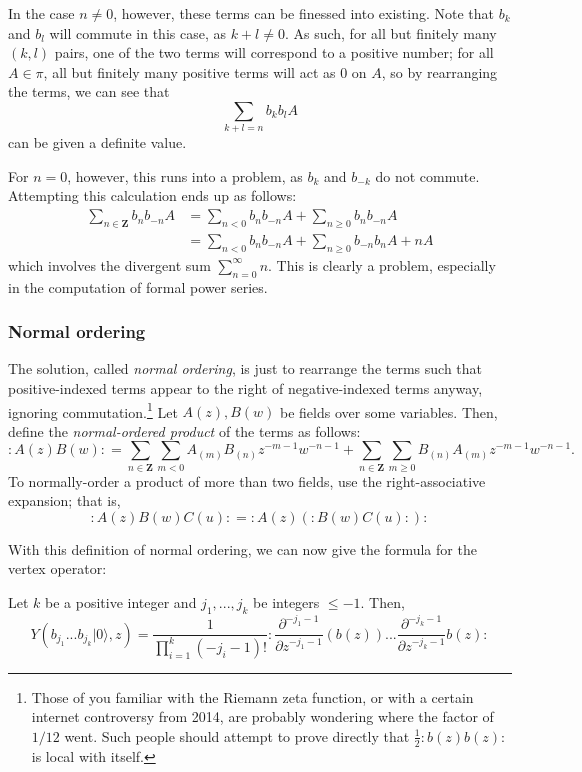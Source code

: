 \documentclass{article}
\newcommand{\ZZ}{\mathbold{Z}}
\newcommand{\vac}{|0\rangle}
\newcommand{\normord}[1]{:\mathrel{#1}:}
\begin{document}
In the case $n \ne 0$, however, these terms can be finessed into existing.  Note that $b_k$ and $b_l$ will commute in this case, as $k+l \ne 0$.  As such, for all but finitely many $(k,l)$ pairs, one of the two terms will correspond to a positive number; for all $A \in \pi$, all but finitely many positive terms will act as $0$ on $A$, so by rearranging the terms, we can see that
\[\sum_{k+l=n}b_kb_lA \]
can be given a definite value.

For $n=0$, however, this runs into a problem, as $b_k$ and $b_{-k}$ do not commute.  Attempting this calculation ends up as follows:
\begin{align*}
  \sum_{n \in \ZZ}b_nb_{-n}A&=\sum_{n < 0}b_nb_{-n}A + \sum_{n \ge 0}b_nb_{-n}A\\
  &=\sum_{n<0}b_nb_{-n}A+\sum_{n \ge 0}b_{-n}b_nA+nA
\end{align*}
which involves the divergent sum $\sum_{n=0}^\infty n$.  This is clearly a problem, especially in the computation of formal power series.

\subsubsection{Normal ordering}

The solution, called \textit{normal ordering}, is just to rearrange the terms such that positive-indexed terms appear to the right of negative-indexed terms anyway, ignoring commutation.\footnote{Those of you familiar with the Riemann zeta function, or with a certain internet controversy from 2014, are probably wondering where the factor of $1/12$ went.  Such people should attempt to prove directly that $\frac{1}{2}\normord{b(z)b(z)}$ is local with itself.}  Let $A(z),B(w)$ be fields over some variables.  Then, define the \textit{normal-ordered product} of the terms as follows:
\[\normord{A(z)B(w)} = \sum_{n \in \ZZ}\sum_{m<0}A_{(m)}B_{(n)}z^{-m-1}w^{-n-1}+\sum_{n \in \ZZ}\sum_{m \ge 0}B_{(n)}A_{(m)}z^{-m-1}w^{-n-1}. \]
To normally-order a product of more than two fields, use the right-associative expansion; that is,
\[ \normord{A(z)B(w)C(u)}  =\normord{ A(z) (\normord{B(w)C(u)} )} \]

With this definition of normal ordering, we can now give the formula for the vertex operator:

Let $k$ be a positive integer and $j_1,...,j_k$ be integers $\le -1$.  Then,
\[Y(b_{j_1}...b_{j_k}\vac,z)=\frac{1}{\prod_{i=1}^k(-j_i-1)!} \normord{\frac{\partial^{-j_1-1}}{\partial z^{-j_1-1}}(b(z))...\frac{\partial^{-j_k-1}}{\partial z^{-j_k-1}}b(z)} \]
\end{document}
